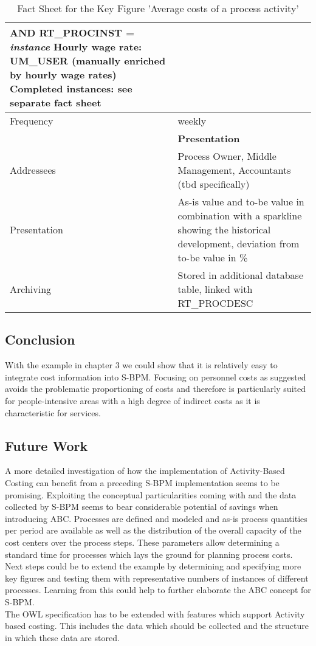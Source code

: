 \begin{table}[htbp]
\begin{tabular}{|p{3.0 cm } |p{10.0 cm }|}
		\hspace*{4mm}\textbf{AND} RT\_PROCINST = \textit{instance} \newline
		Hourly wage rate: UM\_USER (manually enriched by hourly wage rates) \newline
		Completed instances: see separate fact sheet\\
		\hline
		Frequency & weekly\\
		\hline
		\hline
		& \textbf{Presentation} \\
		\hline
		Addressees & Process Owner, Middle Management, Accountants (tbd specifically)\\
		\hline
		Presentation & As-is value and to-be value in combination with a sparkline showing the historical development, deviation from to-be value in \%\\
		\hline
		Archiving & Stored in additional database table, linked with RT\_PROCDESC\\
		\hline
	\end{tabular}
\label{tab:FactSgeet}
\caption{Fact Sheet for the Key Figure 'Average costs of a process activity'}
\end{table}

\subsection{Conclusion}
With the example in chapter 3 we could show that it is relatively easy to integrate cost information into S-BPM. Focusing on personnel costs as suggested avoids the problematic proportioning of costs and therefore is particularly suited for people-intensive areas with a high degree of indirect costs as it is characteristic for services.


\subsection{ Future Work}
A more detailed investigation of how the implementation of Activity-Based Costing can benefit from a preceding S-BPM implementation seems to be promising. Exploiting the conceptual particularities coming with and the data collected by S-BPM seems to bear considerable potential of savings when introducing ABC. Processes are defined and modeled and as-is process quantities per period are available as well as the distribution of the overall capacity of the cost centers over the process steps. These parameters allow determining a standard time for processes which lays the ground for planning process costs.
Next steps could be to extend the example by determining and specifying more key figures and testing them with representative numbers of instances of different processes. Learning from this could help to further elaborate the ABC concept for S-BPM.\\
The OWL specification has to be extended with features which support Activity based costing. This includes the data which should be collected and the structure in which these data are stored.
